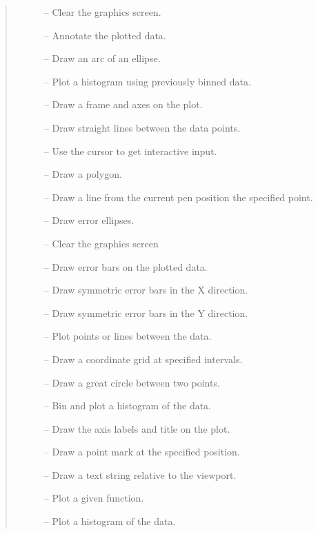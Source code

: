 \small
\begin {quote}
  \begin {description}
  \item [] -- Clear the graphics screen.
  \item [] -- Annotate the plotted data.
  \item [] -- Draw an arc of an ellipse.
  \item [] -- Plot a histogram using previously binned data.
  \item [] -- Draw a frame and axes on the plot.
  \item [] -- Draw straight lines between the
    data points.
  \item [] -- Use the cursor to get interactive input.
  \item [] -- Draw a polygon.
  \item [] -- Draw a line from the current pen position the specified
    point.
  \item [] -- Draw error ellipses.
  \item [] -- Clear the graphics screen
  \item [] -- Draw error bars on the plotted data.
  \item [] -- Draw symmetric error bars in the X direction.
  \item [] -- Draw symmetric error bars in the Y direction.
  \item [] -- Plot points or lines between the data.
  \item [] -- Draw a coordinate grid at specified intervals.
  \item [] -- Draw a great circle between two points.
  \item [] -- Bin and plot a histogram of
    the data.
  \item [] -- Draw the axis labels and title on
    the plot.
  \item [] -- Draw a point mark at the specified position.
  \item [] -- Draw a text string relative to the viewport.
  \item [] -- Plot a given function.
  \item [] -- Plot a histogram of the data.

\end{description}
\end{quote}
